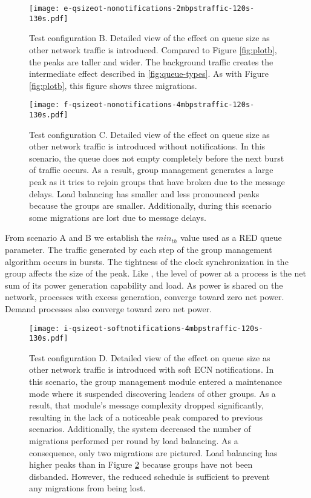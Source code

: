 \begin{figure}
\centering
\texttt{[image: e-qsizeot-nonotifications-2mbpstraffic-120s-130s.pdf]}
\caption[Detailed view of the effect on queue size as other network traffic is introduced.]{
    Test configuration B.
Detailed view of the effect on queue size as other network traffic is introduced.
Compared to Figure \ref{fig:plotb}, the peaks are taller and wider. 
The background traffic creates the intermediate effect described in \ref{fig:queue-types}.
As with Figure \ref{fig:plotb}, this figure shows three migrations.}
\label{fig:plote}
\end{figure}

\begin{figure}
\centering
\texttt{[image: f-qsizeot-nonotifications-4mbpstraffic-120s-130s.pdf]}
\caption[Detailed view of the effect on queue size as other network traffic is introduced without notifications.]{
    Test configuration C.
Detailed view of the effect on queue size as other network traffic is introduced without notifications.
In this scenario, the queue does not empty completely before the next burst of traffic occurs.
As a result, group management generates a large peak as it tries to rejoin groups that have broken due to the message delays.
Load balancing has smaller and less pronounced peaks because the groups are smaller.
Additionally, during this scenario some migrations are lost due to message delays.}
\label{fig:plotf}
\end{figure}

From scenario A and B we establish the $min_{th}$ value used as a \ac{RED} queue parameter.
The traffic generated by each step of the group management algorithm occurs in bursts.
The tightness of the clock synchronization in the group affects the size of the peak.
Like \cite{HILTESTBED}, the level of power at a process is the net sum of its power generation capability and load.
As power is shared on the network, processes with excess generation, converge toward zero net power.
Demand processes also converge toward zero net power.

\begin{figure}
\centering
\texttt{[image: i-qsizeot-softnotifications-4mbpstraffic-120s-130s.pdf]}
\caption[Detailed view of the effect on queue size as other network traffic is introduced with soft \ac{ECN} notifications.]{
    Test configuration D.
Detailed view of the effect on queue size as other network traffic is introduced with soft \ac{ECN} notifications.
In this scenario, the group management module entered a maintenance mode where it suspended discovering leaders of other groups.
As a result, that module's message complexity dropped significantly, resulting in the lack of a noticeable peak compared to previous scenarios.
Additionally, the system decreased the number of migrations performed per round by load balancing.
As a consequence, only two migrations are pictured.
Load balancing has higher peaks than in Figure \ref{fig:plotf} because groups have not been disbanded.
However, the reduced schedule is sufficient to prevent any migrations from being lost.
}
\label{fig:ploti}
\end{figure}

